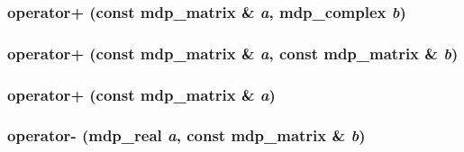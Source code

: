 \label{classmdp__matrix_a179b66f81eb9cc41cf4e47424fbb043a}
\hypertarget{classmdp__matrix_a9c3c774b4ef0650ed3ede792dd8b9bcc}{
\subsubsection[{operator+}]{ operator+ (const {\bf mdp\_\-matrix} \& {\em a}, \/  {\bf mdp\_\-complex} {\em b})}}
\label{classmdp__matrix_a9c3c774b4ef0650ed3ede792dd8b9bcc}
\hypertarget{classmdp__matrix_a17f483c5cf65d00c950c21fb7e467a71}{
\subsubsection[{operator+}]{ operator+ (const {\bf mdp\_\-matrix} \& {\em a}, \/  const {\bf mdp\_\-matrix} \& {\em b})}}
\label{classmdp__matrix_a17f483c5cf65d00c950c21fb7e467a71}
\hypertarget{classmdp__matrix_ac277f7b8abb06215be34e3db82ff6c0a}{
\subsubsection[{operator+}]{ operator+ (const {\bf mdp\_\-matrix} \& {\em a})}}
\label{classmdp__matrix_ac277f7b8abb06215be34e3db82ff6c0a}
\hypertarget{classmdp__matrix_a0034bcdf68e3b07c30b406e046401937}{
\subsubsection[{operator-\/}]{ operator-\/ ({\bf mdp\_\-real} {\em a}, \/  const {\bf mdp\_\-matrix} \& {\em b})}}
